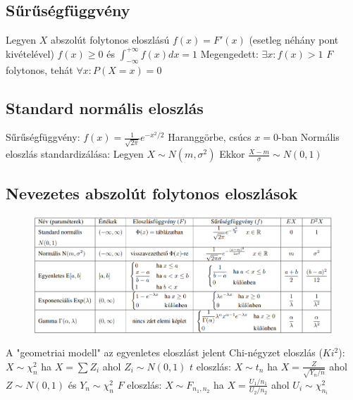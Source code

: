 \documentclass[12pt,a4paper]{article}
\begin{document}
\subsection{Sűrűségfüggvény}

\begin{outline}
	\1 Legyen $X$ abszolút folytonos eloszlású
	\1 $f(x) = F'(x)$ (esetleg néhány pont kivételével)
	\1 $f(x) \ge 0$ és $\int_{-\infty}^{+\infty}f(x)dx = 1$
		\2 Megengedett: $\exists x: f(x) > 1$
	\1 $F$ folytonos, tehát $\forall x: P(X=x) = 0$
\end{outline}

\subsection{Standard normális eloszlás}

\begin{outline}
	\1 Sűrűségfüggvény: $f(x) = \frac{1}{\sqrt{2\pi}} e^{-x^2/2}$
		\2 Haranggörbe, csúcs $x=0$-ban
	\1 Normális eloszlás standardizálása:
		\2 Legyen $X \sim N(m, \sigma^2)$
		\2 Ekkor $\frac{X-m}{\sigma} \sim N(0,1)$
\end{outline}

\pagebreak

\subsection{Nevezetes abszolút folytonos eloszlások}

\begin{figure}[h!]
	\centering
	\includegraphics[width=1\linewidth]{abszolút-folytonos-eloszlások}
\end{figure}

\begin{outline}
	\1 A "geometriai modell" az egyenletes eloszlást jelent
	\1 Chi-négyzet eloszlás ($Ki^2$): $X \sim \chi^2_n$ ha $X = \sum Z_i$ ahol $Z_i \sim N(0,1)$
	\1 $t$ eloszlás: $X \sim t_n$ ha $X=\frac{Z}{\sqrt{Y_n/n}}$ ahol $Z \sim N(0,1)$ és $Y_n \sim \chi^2_n$
	\1 $F$ eloszlás: $X \sim F_{n_1,n_2}$ ha $X=\frac{U_1/n_1}{U_2/n_2}$ ahol $U_i \sim \chi^2_{n_i}$
\end{outline}
\end{document}
